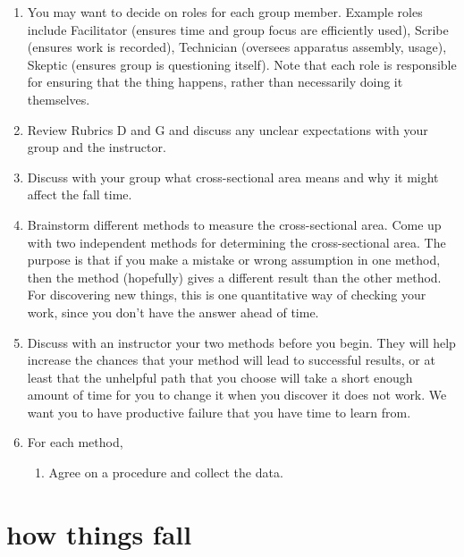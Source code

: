 \begin{enumerate}
	\item You may want to decide on roles for each group member. Example roles include Facilitator (ensures time and group focus are efficiently used), Scribe (ensures work is recorded), Technician (oversees apparatus assembly, usage), Skeptic (ensures group is questioning itself). Note that each role is responsible for ensuring that the thing happens, rather than necessarily doing it themselves.
	
	\item Review Rubrics D and G and discuss any unclear expectations with your group and the instructor.
	
	\item Discuss with your group what cross-sectional area means and why it might affect the fall time.
	
	\item Brainstorm different methods to measure the cross-sectional area. Come up with two independent methods for determining the cross-sectional area. The purpose is that if you make a mistake or wrong assumption in one method, then the method (hopefully) gives a different result than the other method. For discovering new things, this is one quantitative way of checking your work, since you don't have the answer ahead of time.
	
	\item Discuss with an instructor your two methods before you begin. They will help increase the chances that your method will lead to successful results, or at least that the unhelpful path that you choose will take a short enough amount of time for you to change it when you discover it does not work. We want you to have productive failure that you have time to learn from.
	
	\item For each method,
	\begin{enumerate}
		\item Agree on a procedure and collect the data.
	\end{enumerate}
	
\end{enumerate}
 
\section{how things fall}

 
